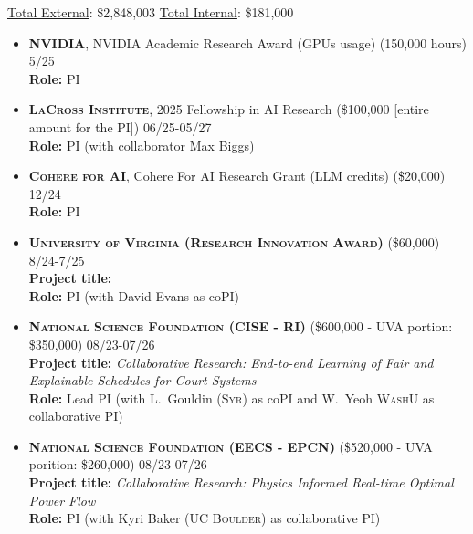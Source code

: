 
\begin{keywords}
{\underline{Total External}: \$2,848,003 %
\hspace{8pt} \underline{Total Internal}: \$181,000}%
\end{keywords}

\begin{itemize}
	\item \textbf{\textsc{NVIDIA}}, 
	NVIDIA Academic Research Award (GPUs usage) (150,000 hours) \hfill \textsc{5/25}\\
	{\bf Role:} PI

	\item \textbf{\textsc{LaCross Institute}}, 
	2025 Fellowship in AI Research 
	(\$100,000 [entire amount for the PI]) \hfill \textsc{06/25-05/27}\\
	{\bf Role:} PI (with collaborator Max Biggs)

	\item \textbf{\textsc{Cohere for AI}}, 
	Cohere For AI Research Grant (LLM credits) (\$20,000) \hfill \textsc{12/24}\\
	{\bf Role:} PI

	\item \textbf{\textsc{University of Virginia (Research Innovation Award)}}
	(\$60,000)
	\hfill \textsc{8/24-7/25}\\
	{\bf Project title:} \\
	{\bf Role:} PI (with David Evans as coPI)

	\item 
	\textbf{\textsc{National Science Foundation (CISE - RI)}}
	(\$600,000 - UVA portion: \$350,000)
	\hfill \textsc{08/23-07/26}\\
	{\bf Project title:} 
	{\em Collaborative Research: End-to-end Learning of Fair and Explainable Schedules for Court Systems}\\
	{\bf Role:} Lead PI (with L.~Gouldin (\textsc{Syr}) as coPI and W.~Yeoh \textsc{WashU} as collaborative PI)

	\item
	\textbf{\textsc{National Science Foundation (EECS - EPCN)}}
	(\$520,000 - UVA porition: \$260,000)
	\hfill \textsc{08/23-07/26}\\
	{\bf Project title:} 
	{\em Collaborative Research: Physics Informed Real-time Optimal Power Flow}\\
	{\bf Role:} PI (with Kyri Baker (\textsc{UC Boulder}) as collaborative PI)
	

\end{itemize}

